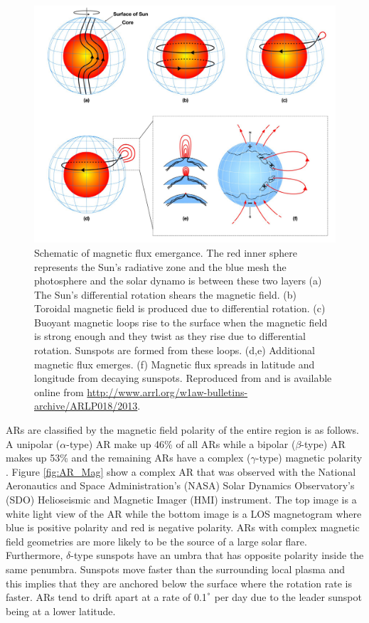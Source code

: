 	\begin{figure}
		\centering
		\includegraphics[width=\textwidth]{dynamo.pdf}
		\caption{
				 Schematic of magnetic flux emergance.
				 The red inner sphere represents the Sun's radiative zone and the blue mesh the photosphere and the solar dynamo is between these two layers
				 (a) The Sun's differential rotation shears the magnetic field.
				 (b) Toroidal magnetic field is produced due to differential rotation.
				 (c) Buoyant magnetic loops rise to the surface when the magnetic field is strong enough and they twist as they rise due to differential rotation.
				 Sunspots are formed from these loops.
				 (d,e) Additional magnetic flux emerges. 
				 (f) Magnetic flux spreads in latitude and longitude from decaying sunspots.
			     Reproduced from \cite{1367-2630-9-8-297} and is available online from \url{http://www.arrl.org/w1aw-bulletins-archive/ARLP018/2013}.
		        }
		\label{fig:dynamo_field}
	\end{figure}
			
	ARs are classified by the magnetic field polarity of the entire region is as follows.
	A unipolar ($\alpha$-type) AR make up 46\% of all ARs while a bipolar ($\beta$-type) AR makes up 53\% and the remaining ARs have a complex ($\gamma$-type) magnetic polarity \citep{2014masu.book.....P}.
	Figure \ref{fig:AR_Mag} show a complex AR that was observed with the National Aeronautics and Space Administration's (NASA) Solar Dynamics Observatory's (SDO) Helioseismic and Magnetic Imager (HMI) instrument.
	The top image is a white light view of the AR while the bottom image is a LOS magnetogram where blue is positive polarity and red is negative polarity.
	ARs with complex magnetic field geometries are more likely to be the source of a large solar flare.
	Furthermore, $\delta$-type sunspots have an umbra that has opposite polarity inside the same penumbra.
	Sunspots move faster than the surrounding local plasma and this implies that they are anchored below the surface where the rotation rate is faster.
	ARs tend to drift apart at a rate of 0.1$^\degree$ per day due to the leader sunspot being at a lower latitude.
	

